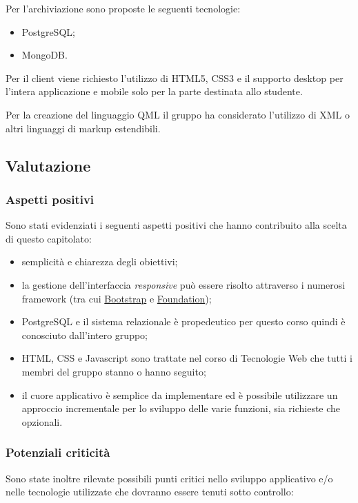 \documentclass[12pt,a4paper]{article}
\begin{document}
Per l'archiviazione sono proposte le seguenti tecnologie:

\begin{itemize}
\item PostgreSQL;
\item MongoDB.
\end{itemize}

Per il client viene richiesto l'utilizzo di HTML5, CSS3 e il supporto desktop per l'intera applicazione e mobile
solo per la parte destinata allo studente.

Per la creazione del linguaggio QML il gruppo ha considerato l'utilizzo di XML o altri linguaggi di markup
estendibili.

\subsection{Valutazione}
\subsubsection{Aspetti positivi}

Sono stati evidenziati i seguenti aspetti positivi che hanno contribuito alla scelta di
questo capitolato:

\begin{itemize}
\item semplicità e chiarezza degli obiettivi;
\item la gestione dell'interfaccia \textit{responsive} può essere risolto attraverso i numerosi
    framework (tra cui \href{http://getbootstrap.com}{Bootstrap} e \href{http://foundation.zurb.com}{Foundation});
\item PostgreSQL e il sistema relazionale è propedeutico per questo corso quindi è conosciuto dall'intero gruppo;
\item HTML, CSS e Javascript sono trattate nel corso di Tecnologie Web che tutti i membri del gruppo stanno o hanno
seguito;
\item il cuore applicativo è semplice da implementare ed è possibile utilizzare un approccio incrementale
per lo sviluppo delle varie funzioni, sia richieste che opzionali.
\end{itemize}

\subsubsection{Potenziali criticità}

Sono state inoltre rilevate possibili punti critici nello sviluppo applicativo e/o nelle tecnologie utilizzate
che dovranno essere tenuti sotto controllo:
\end{document}
